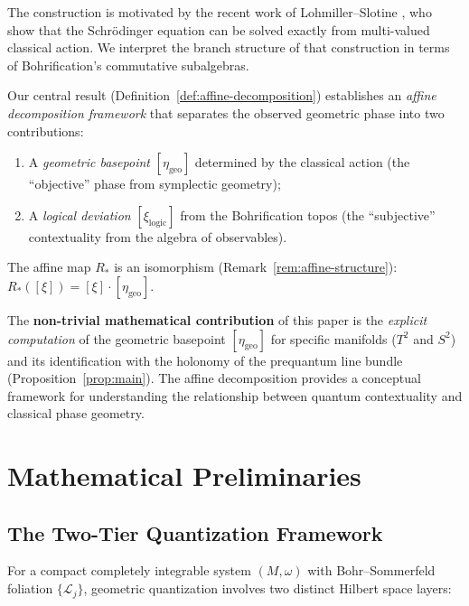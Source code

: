 \documentclass[11pt]{article}
\begin{document}
The construction is motivated by the recent work of Lohmiller--Slotine
\cite{LS26}, who show that the Schr\"odinger equation can be solved exactly
from multi-valued classical action. We interpret the branch structure of
that construction in terms of Bohrification's commutative subalgebras.

Our central result (Definition~\ref{def:affine-decomposition}) establishes an
\emph{affine decomposition framework} that separates the observed geometric
phase into two contributions:
\begin{enumerate}
\item A \emph{geometric basepoint} $[\eta_{\mathrm{geo}}]$ determined by
the classical action (the ``objective'' phase from symplectic geometry);
\item A \emph{logical deviation} $[\xi_{\mathrm{logic}}]$ from the Bohrification
topos (the ``subjective'' contextuality from the algebra of observables).
\end{enumerate}
The affine map $R_*$ is an isomorphism (Remark~\ref{rem:affine-structure}):
$R_*([\xi]) = [\xi] \cdot [\eta_{\mathrm{geo}}]$.

The \textbf{non-trivial mathematical contribution} of this paper is the
\emph{explicit computation} of the geometric basepoint $[\eta_{\mathrm{geo}}]$
for specific manifolds ($T^2$ and $S^2$) and its identification with the
holonomy of the prequantum line bundle (Proposition~\ref{prop:main}).
The affine decomposition provides a conceptual framework for understanding
the relationship between quantum contextuality and classical phase geometry.

\section{Mathematical Preliminaries}

\subsection{The Two-Tier Quantization Framework}

For a compact completely integrable system $(M, \omega)$ with Bohr--Sommerfeld
foliation $\{\mathcal{L}_j\}$, geometric quantization involves two distinct
Hilbert space layers:
\end{document}
